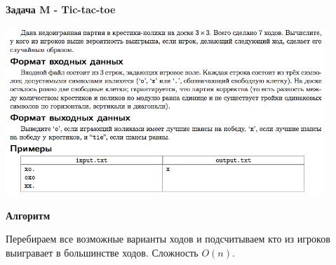 \documentclass[a4paper,12pt]{article}
\begin{document}
\newpage
\textbf{{\large Задача M - Tic-tac-toe}}

\begin{center}
\includegraphics[width=0.9\textwidth]{OC_Udmurtia/OC_Udmurtia_M.png}\\ [1cm]
\end{center}

\textbf{{\large Алгоритм}}

Перебираем все возможные варианты ходов и подсчитываем кто из игроков выигравает в большинстве ходов. Сложность $O(n)$. \\
\end{document}
